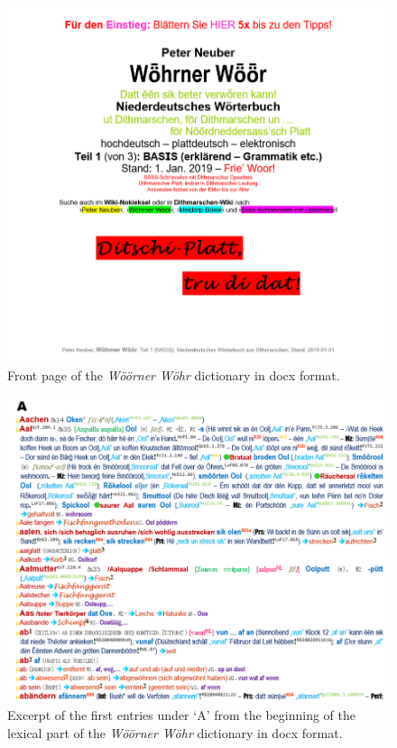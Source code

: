 \begin{figure}
    \centering
    \includegraphics[width=1\linewidth]{img/woewoe_cover.png}
    \caption{Front page of the \emph{Wöörner Wöhr} dictionary in docx format.}
    \label{fig:enter-label}
\end{figure}

\begin{figure}
    \centering
    \includegraphics[width=1\linewidth]{img/woewoe_excerpt.png}
    \caption{Excerpt of the first entries under ‘A’ from the beginning of the lexical part of the \emph{Wöörner Wöhr} dictionary in docx format.}
    \label{fig:enter-label}
\end{figure}

